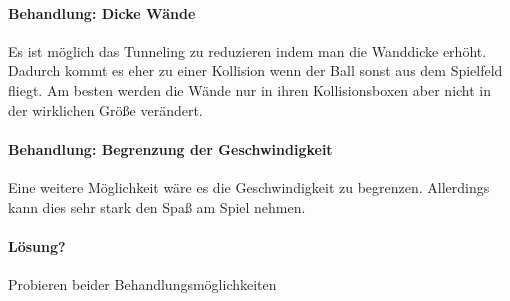 \paragraph{Behandlung: Dicke Wände}
Es ist möglich das Tunneling zu reduzieren indem man die Wanddicke erhöht. Dadurch kommt es eher zu einer Kollision wenn der Ball sonst aus dem Spielfeld fliegt.
\newline
Am besten werden die Wände nur in ihren Kollisionsboxen aber nicht in der wirklichen Größe verändert.
\paragraph{Behandlung: Begrenzung der Geschwindigkeit}
Eine weitere Möglichkeit wäre es die Geschwindigkeit zu begrenzen. Allerdings kann dies sehr stark den Spaß am Spiel nehmen.
\paragraph{Lösung?}
Probieren beider Behandlungsmöglichkeiten
